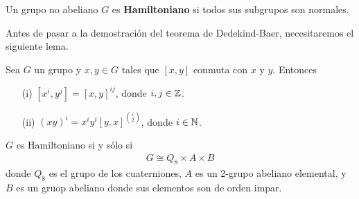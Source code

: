 \begin{definicion}
        Un grupo no abeliano $G$ es \textbf{Hamiltoniano} si todos sus subgrupos son normales.
\end{definicion}

Antes de pasar a la demostración del teorema de Dedekind-Baer, necesitaremos el siguiente lema.

\begin{lema}\label{Lema_Dedekind_Baer}
    Sea $G$ un grupo y $x,y \in G$ tales que $[x,y]$ conmuta con $x$ y $y$. Entonces
    \begin{enumerate}
        \item[(i)]
            $[x^i, y^j] = [x,y]^{ij}$, donde $i,j \in \mathbb{Z}$.
        \item[(ii)]
            $(xy)^i  =   x^iy^i [y,x]^{\binom{i}{2}}$, donde $i \in \mathbb{N}$.
    \end{enumerate}
\end{lema}

\begin{teorema}
    $G$ es Hamiltoniano si y sólo si 
    \begin{align}
        G \cong Q_8 \times A \times B
    \end{align}
    donde $Q_8$ es el grupo de los cuaterniones, $A$ es un 2-grupo abeliano elemental, 
    y $B$ es un gruop abeliano donde sus elementos son de orden impar.
\end{teorema}

